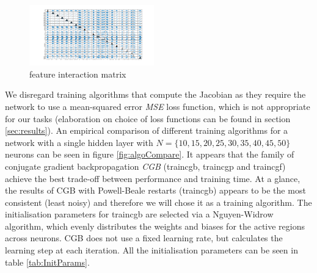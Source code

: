 \documentclass[11pt,a4paper]{article}
\begin{document}
\begin{figure}[htb]
  \centering
    \centering
    \includegraphics[width=0.48\textwidth]{figures/plotmatrix_standardised_X.png}
    \caption{feature interaction matrix}
  \label{fig:plotmatrixStandardisedX}
\end{figure}

We disregard training algorithms that compute the Jacobian as they require the network to use a mean-squared error \textit{MSE} loss function, which is not appropriate for our tasks (elaboration on choice of loss functions can be found in section \ref{sec:results}). An empirical comparison of different training algorithms for a network with a single hidden layer with \(N = \{10,15,20,25,30,35,40,45,50\}\) neurons can be seen in figure \ref{fig:algoCompare}. It appears that the family of conjugate gradient backpropagation \textit{CGB} (traincgb, traincgp and traincgf) achieve the best trade-off between performance and training time. At a glance, the results of CGB with Powell-Beale restarts (traincgb) appears to be the most consistent (least noisy) and therefore we will chose it as a training algorithm. The initialisation parameters for traincgb are selected via a Nguyen-Widrow \autocite{NetParamInit} algorithm, which evenly distributes the weights and biases for the active regions across neurons. CGB does not use a fixed learning rate, but calculates the learning step at each iteration. All the initialisation parameters can be seen in table \ref{tab:InitParams}.
\end{document}
